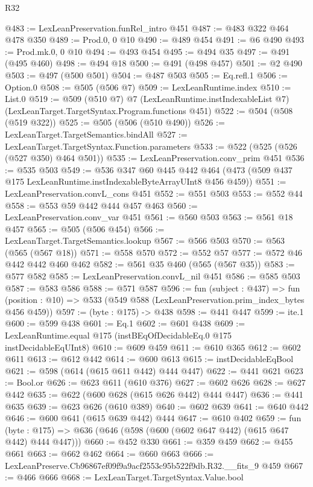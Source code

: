 \begin{lexlean}{R32}
\begin{coremodule}
@483 := LexLeanPreservation.funRel_intro @451
@487 := @483 @322 @464 @478 @350
@489 := Prod.{0, 0} @10
@490 := @489 @454
@491 := @6 @490
@493 := Prod.mk.{0, 0} @10
@494 := @493 @454
@495 := @494 @35
@497 := @491 (@495 @460)
@498 := @494 @18
@500 := @491 (@498 @457)
@501 := @2 @490
@503 := @497 (@500 @501)
@504 := @487 @503
@505 := Eq.refl.{1}
@506 := Option.{0}
@508 := @505 (@506 @7)
@509 := LexLeanRuntime.index
@510 := List.{0}
@519 := @509
    (@510 @7)
    @7
    (LexLeanRuntime.instIndexableList @7)
    (LexLeanTarget.TargetSyntax.Program.functions @451)
@522 := @504 (@508 (@519 @322))
@525 := @505 (@506 (@510 @490))
@526 := LexLeanTarget.TargetSemantics.bindAll
@527 := LexLeanTarget.TargetSyntax.Function.parameters
@533 := @522 (@525 (@526 (@527 @350) @464 @501))
@535 := LexLeanPreservation.conv_prim @451
@536 := @535 @503
@549 := @536
    @347
    @60
    @445
    @442
    @464
    (@473 (@509 @437 @175 LexLeanRuntime.instIndexableByteArrayUInt8 @456 @459))
@551 := LexLeanPreservation.convL_cons @451
@552 := @551 @503
@553 := @552 @44
@558 := @553 @59 @442 @444 @457 @463
@560 := LexLeanPreservation.conv_var @451
@561 := @560 @503
@563 := @561 @18 @457
@565 := @505 (@506 @454)
@566 := LexLeanTarget.TargetSemantics.lookup
@567 := @566 @503
@570 := @563 (@565 (@567 @18))
@571 := @558 @570
@572 := @552 @57
@577 := @572 @46 @442 @442 @460 @462
@582 := @561 @35 @460 (@565 (@567 @35))
@583 := @577 @582
@585 := LexLeanPreservation.convL_nil @451
@586 := @585 @503
@587 := @583 @586
@588 := @571 @587
@596 := fun (subject : @437) =>
  fun (position : @10) => @533 (@549 @588 (LexLeanPreservation.prim_index_bytes @456 @459))
@597 := (byte : @175) -> @438
@598 := @441 @447
@599 := ite.{1}
@600 := @599 @438
@601 := Eq.{1}
@602 := @601 @438
@609 := LexLeanRuntime.equal @175 (instBEqOfDecidableEq.{0} @175 instDecidableEqUInt8)
@610 := @609 @459
@611 := @610 @365
@612 := @602 @611
@613 := @612 @442
@614 := @600 @613
@615 := instDecidableEqBool
@621 := @598 (@614 (@615 @611 @442) @444 @447)
@622 := @441 @621
@623 := Bool.or
@626 := @623 @611 (@610 @376)
@627 := @602 @626
@628 := @627 @442
@635 := @622 (@600 @628 (@615 @626 @442) @444 @447)
@636 := @441 @635
@639 := @623 @626 (@610 @389)
@640 := @602 @639
@641 := @640 @442
@646 := @600 @641 (@615 @639 @442) @444
@647 := @610 @402
@659 := fun (byte : @175) => @636 (@646 (@598 (@600 (@602 @647 @442) (@615 @647 @442) @444 @447)))
@660 := @452 @330
@661 := @359 @459
@662 := @455 @661
@663 := @662 @462
@664 := @660 @663
@666 := LexLeanPreserve.Cb96867ef09f9a9acf2553c95b522f9db.R32.__fits_9 @459
@667 := @466 @666
@668 := LexLeanTarget.TargetSyntax.Value.bool

\end{coremodule}
\end{lexlean}
